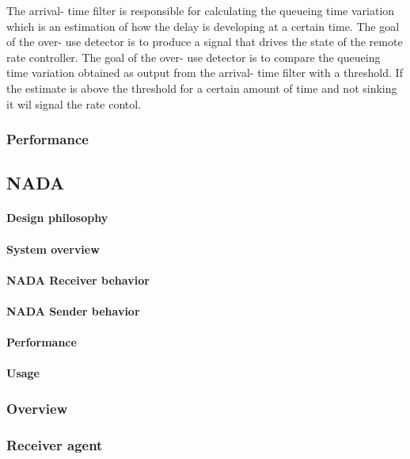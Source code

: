 \documentclass[UKenglish]{ifimaster}
\begin{document}
The arrival- time filter is responsible for calculating the queueing time variation which is an estimation of how the delay is developing at a certain time.
The goal of the over- use detector is to produce a signal that drives the state of the remote rate controller. 
The goal of the over- use detector is to compare the queueing time variation obtained as output from the arrival- time filter with a threshold. If the estimate is above the threshold for a certain amount of time and not sinking it wil signal the rate contol.
\subsubsection{Performance}
\subsection{NADA}

\paragraph{Design philosophy}
\paragraph{System overview}
\paragraph{NADA Receiver behavior}
\paragraph{NADA Sender behavior}
\paragraph{Performance}
\paragraph{Usage}

\subsubsection{Overview}
\subsubsection{Receiver agent}
\end{document}

